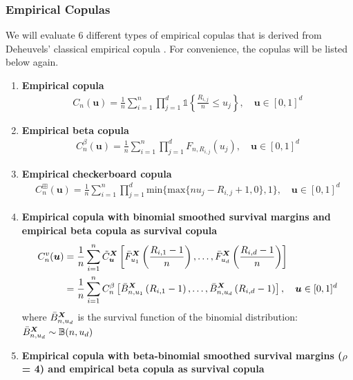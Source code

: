 \documentclass[12pt]{report}
\newcommand{\1}{\mathbf{1}}
\begin{document}
\begin{flushleft}
\subsubsection{Empirical Copulas}

We will evaluate 6 different types of empirical copulas that is derived from Deheuvels' classical empirical copula \parencite{DeheuvelsEC}. For convenience, the copulas will be listed below again.
\begin{enumerate}
\item \textbf{Empirical copula}
\begin{align*}
C_{n}(\boldsymbol{u}) = \frac{1}{n} \sum\limits_{i = 1}^{n} \prod\limits_{j = 1}^{d} \mathds{1}\left\{ \frac{R_{i,j}}{n} \le u_{j} \right\}, \quad \boldsymbol{u} \in [0,1]^{d}
\end{align*}
\item \textbf{Empirical beta copula}
\begin{align*}
C^{\beta}_{n}(\boldsymbol{u}) = \frac{1}{n} \sum\limits_{i = 1}^{n} \prod\limits_{j = 1}^{d} F_{n,R_{i,j}}(u_{j}), \quad \boldsymbol{u} \in [0,1]^{d}
\end{align*}
\item \textbf{Empirical checkerboard copula}
\begin{align*}
C_{n}^{\boxplus}(\boldsymbol{u}) = \frac{1}{n} \sum\limits_{i = 1}^{n} \prod\limits_{j = 1}^{d} \mathrm{min} \{ \mathrm{max} \{ n u_{j} - R_{i,j} + 1, 0 \}, 1 \}, \quad \boldsymbol{u} \in [0,1]^{d}
\end{align*}
\item \textbf{Empirical copula with binomial smoothed survival margins and empirical beta copula as survival copula}
\begin{align*}
C_{n}^{v}(\boldsymbol{u}) &= \frac{1}{n} \sum\limits_{i = 1}^{n} \Tilde{C}_{\boldsymbol{u}}^{\boldsymbol{X}} \left[\Bar{F}_{u_{1}}^{\boldsymbol{X}}\left(\frac{R_{i,1} - 1}{n}\right), \dots, \Bar{F}_{u_{d}}^{\boldsymbol{X}}\left(\frac{R_{i,d} - 1}{n}\right) \right] \\
&= \frac{1}{n} \sum\limits_{i = 1}^{n} C_{n}^{\beta} \left[\Bar{B}_{n, u_{1}}^{\boldsymbol{X}}\left(R_{i,1} - 1\right), \dots, \Bar{B}_{n, u_{d}}^{\boldsymbol{X}}\left(R_{i,d} - 1\right) \right], \quad \boldsymbol{u} \in [0,1]^{d}
\end{align*}
where $\Bar{B}_{n, u_{d}}^{\boldsymbol{X}}$ is the survival function of the binomial distribution: $\Bar{B}_{n, u_{d}}^{\boldsymbol{X}} \sim \mathbb{B}(n, u_{d})$
\item \textbf{Empirical copula with beta-binomial smoothed survival margins ($\rho$ = 4) and empirical beta copula as survival copula}

\end{enumerate}
\end{flushleft}
\end{document}
